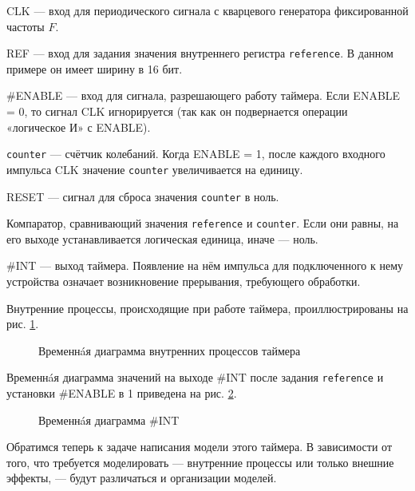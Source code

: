 \begin{itemize*}
    \item CLK — вход для периодического сигнала с кварцевого генератора фиксированной частоты $F$. %
    \item REF — вход для задания значения внутреннего регистра \texttt{reference}. В данном примере он имеет ширину в 16 бит.
    \item \#ENABLE — вход для сигнала, разрешающего работу таймера. Если ENABLE = 0, то сигнал CLK игнорируется (так как он подвернается операции «логическое И» с ENABLE).
    \item \texttt{counter} — счётчик колебаний. Когда ENABLE = 1, после каждого входного импульса CLK значение \texttt{counter} увеличивается на единицу.
    \item RESET — сигнал для сброса значения \texttt{counter} в ноль.
    \item Компаратор, сравнивающий значения \texttt{reference} и \texttt{counter}. Если они равны, на его выходе устанавливается логическая единица, иначе — ноль.
    \item \#INT — выход таймера. Появление на нём импульса для подключенного к нему устройства означает возникновение прерывания, требующего обработки.
\end{itemize*}

Внутренние процессы, происходящие при работе таймера, проиллюстрированы на рис. \ref{fig:counter-diagram}.

\begin{figure}[htp]
    \centering
    \caption[Временнáя диаграмма внутренних процессов]{Временнáя диаграмма внутренних процессов таймера}
    \label{fig:counter-diagram}
\end{figure}

Временнáя диаграмма значений на выходе \#INT после задания \texttt{reference} и установки \#ENABLE в 1 приведена на рис. \ref{fig:timer-diagram}.

\begin{figure}[htp]
    \centering
    \caption[Временнáя диаграмма \#INT]{Временнáя диаграмма \#INT}
    \label{fig:timer-diagram}
\end{figure}

Обратимся теперь к задаче написания модели этого таймера. В зависимости от того, что требуется моделировать — внутренние процессы или только внешние эффекты, — будут различаться и организации моделей.


